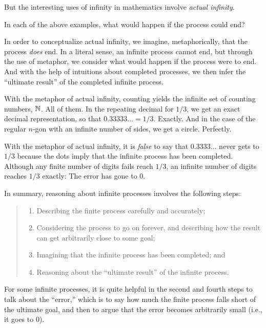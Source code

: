 But the interesting uses of infinity in mathematics involve \emph{actual infinity}.  
\begin{question}
In each of the above examples, what would happen if the process could end?
\end{question}
\QM

In order to conceptualize actual infinity, we imagine, metaphorically, that the process \emph{does} end.  In a literal sense, an infinite process cannot end, but through the use of metaphor, we consider what would happen if the process were to end.  And with the help of intuitions about completed processes, we then infer the ``ultimate result'' of the completed infinite process.    

With the metaphor of actual infinity, counting yields the infinite set of counting numbers, $\mathbb N$.  All of them.  In the repeating decimal for $1/3$, we get an exact decimal representation, so that $0.33333\ldots = 1/3$.  Exactly.  And in the case of the regular $n$-gon with an infinite number of sides, we get a circle.  Perfectly.  

\begin{warning}
With the metaphor of actual infinity, it is \emph{false} to say that $0.3333\ldots$ never gets to $1/3$ because the dots imply that the infinite process has been completed.  Although any finite number of digits fails reach $1/3$, an infinite number of digits reaches $1/3$ exactly:  The error has gone to 0.  
\end{warning}

In summary, reasoning about infinite processes involves the following steps:  
\begin{quote}
\begin{enumerate}
\item Describing the finite process carefully and accurately;
\item Considering the process to go on forever, and describing how the result can get arbitrarily close to some goal;
\item Imagining that the infinite process has been completed; and
\item Reasoning about the ``ultimate result'' of the infinite process.
\end{enumerate}
\end{quote}

For some infinite processes, it is quite helpful in the second and fourth steps to talk about the ``error,'' which is to say how much the finite process falls short of the ultimate goal, and then to argue that the error becomes arbitrarily small (i.e., it goes to 0). 

